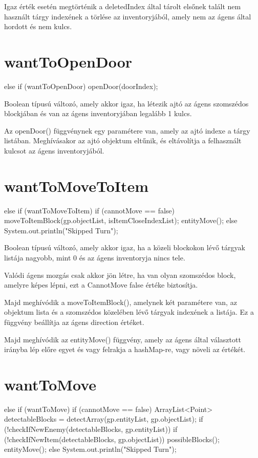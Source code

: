 Igaz érték esetén megtörténik a deletedIndex által tárolt elsőnek talált nem használt tárgy indexének a törlése az inventoryjából, 
amely nem az ágens által hordott és nem kulcs.

\section{wantToOpenDoor}
\begin{java}
else if (wantToOpenDoor) {
    openDoor(doorIndex);
}
\end{java}

Boolean típusú változó, amely akkor igaz, ha létezik ajtó az ágens szomszédos blockjában és van az ágens inventoryjában legalább 1 kulcs.

Az openDoor() függvénynek egy paramétere van, amely az ajtó indexe a tárgy listában. Meghívásakor
az ajtó objektum eltűnik, és eltávolítja a felhasznált kulcsot az ágens inventoryjából.

\section{wantToMoveToItem}

\begin{java}
else if (wantToMoveToItem) {
    if (cannotMove == false) {
        moveToItemBlock(gp.objectList,
        isItemCloseIndexList);
        entityMove();
    } else System.out.println("Skipped Turn");
}
\end{java}


Boolean típusú változó, amely akkor igaz, ha a közeli blockokon lévő tárgyak listája nagyobb, mint 0 és az ágens inventoryja nincs tele.

Valódi ágens mozgás csak akkor jön létre, ha van olyan szomszédos block, amelyre képes lépni, ezt a CannotMove false értéke biztosítja.

Majd meghívódik a moveToItemBlock(), amelynek két paramétere van, az objektum lista és a szomszédos közelében lévő tárgyak indexének a listája.
Ez a függvény beállítja az ágens direction értéket.

Majd meghívódik az entityMove() függvény, amely az ágens által választott irányba lép előre egyet és vagy felrakja a hashMap-re, vagy növeli az értékét.

\section{wantToMove}

\begin{java}
else if (wantToMove) {
    if (cannotMove == false) {
        ArrayList<Point> detectableBlocks =
            detectArray(gp.entityList, gp.objectList);
        if (!checkIfNewEnemy(detectableBlocks,
        gp.entityList)) {
            if (!checkIfNewItem(detectableBlocks,
            gp.objectList)) {
                possibleBlocks();
            }
        }
        entityMove();
    } else System.out.println("Skipped Turn");
}
\end{java}

